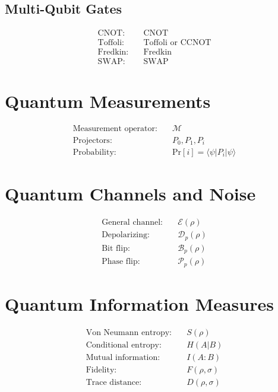 \documentclass[12pt]{article}
\newcommand{\braket}[2]{\langle#1|#2\rangle}
\newcommand{\cnot}{\text{CNOT}}
\newcommand{\ccnot}{\text{CCNOT}}
\newcommand{\toffoli}{\text{Toffoli}}
\newcommand{\fredkin}{\text{Fredkin}}
\newcommand{\swap}{\text{SWAP}}
\newcommand{\measure}{\mathcal{M}}
\newcommand{\proj}[1]{P_{#1}}
\newcommand{\projzero}{\proj{0}}
\newcommand{\projone}{\proj{1}}
\newcommand{\channel}{\mathcal{E}}
\newcommand{\depolar}{\mathcal{D}}
\newcommand{\bitflip}{\mathcal{B}}
\newcommand{\phaseflip}{\mathcal{P}}
\newcommand{\condentropy}[2]{H(#1|#2)}
\newcommand{\mutualinfo}[2]{I(#1:#2)}
\newcommand{\vonneumann}[1]{S(#1)}
\newcommand{\fidelity}[2]{F(#1, #2)}
\newcommand{\tracedist}[2]{D(#1, #2)}
\newcommand{\prob}[1]{\text{Pr}[#1]}
\theoremstyle{definition}
\theoremstyle{remark}
\begin{document}
\begin{multicols}{2}
\subsection{Multi-Qubit Gates}
\begin{align}
\text{CNOT:} &\quad \cnot \\
\text{Toffoli:} &\quad \toffoli \text{ or } \ccnot \\
\text{Fredkin:} &\quad \fredkin \\
\text{SWAP:} &\quad \swap
\end{align}

\section{Quantum Measurements}

\begin{align}
\text{Measurement operator:} &\quad \measure \\
\text{Projectors:} &\quad \projzero, \projone, \proj{i} \\
\text{Probability:} &\quad \prob{i} = \braket{\psi}{\proj{i}|\psi}
\end{align}

\section{Quantum Channels and Noise}

\begin{align}
\text{General channel:} &\quad \channel(\rho) \\
\text{Depolarizing:} &\quad \depolar_p(\rho) \\
\text{Bit flip:} &\quad \bitflip_p(\rho) \\
\text{Phase flip:} &\quad \phaseflip_p(\rho)
\end{align}

\section{Quantum Information Measures}

\begin{align}
\text{Von Neumann entropy:} &\quad \vonneumann{\rho} \\
\text{Conditional entropy:} &\quad \condentropy{A}{B} \\
\text{Mutual information:} &\quad \mutualinfo{A}{B} \\
\text{Fidelity:} &\quad \fidelity{\rho}{\sigma} \\
\text{Trace distance:} &\quad \tracedist{\rho}{\sigma}
\end{align}


\end{multicols}
\end{document}
